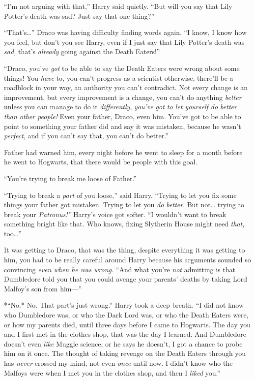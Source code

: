 ``I'm not arguing with that,'' Harry said quietly. ``But will you say
that Lily Potter's death was sad? Just say that one thing?''

``That's\ldots{}'' Draco was having difficulty finding words again. ``I
know, I know how you feel, but don't you see Harry, even if I just say
that Lily Potter's death was \emph{sad,} that's \emph{already} going
against the Death Eaters!''

``Draco, you've \emph{got} to be able to say the Death Eaters were wrong
about some things! You \emph{have} to, you can't progress as a scientist
otherwise, there'll be a roadblock in your way, an authority you can't
contradict. Not every change is an improvement, but every improvement is
a change, you can't do anything \emph{better} unless you can manage to
do it \emph{differently}, \emph{you've got to let yourself do better
than other people!} Even your father, Draco, even him. You've got to be
able to point to something your father did and say it was mistaken,
because he wasn't \emph{perfect}, and if you can't say that, you can't
do better.''

Father had warned him, every night before he went to sleep for a month
before he went to Hogwarts, that there would be people with this goal.

``You're trying to break me loose of Father.''

``Trying to break a \emph{part} of you loose,'' said Harry. ``Trying to
let you fix some things your father got mistaken. Trying to let you
\emph{do better}. But not\ldots{} trying to break your
\emph{Patronus!''} Harry's voice got softer. ``I wouldn't want to break
something bright like that. Who knows, fixing Slytherin House might need
\emph{that}, too\ldots{}''

It was getting to Draco, that was the thing, despite everything it was
getting to him, you had to be really careful around Harry because his
arguments sounded so convincing \emph{even when he was wrong.} ``And
what you're \emph{not} admitting is that Dumbledore told you that you
could avenge your parents' deaths by taking Lord Malfoy's son from
him---''

*``No.* No. That part's just wrong.'' Harry took a deep breath. ``I did
not know who Dumbledore was, or who the Dark Lord was, or who the Death
Eaters were, or how my parents died, until three days before I came to
Hogwarts. The day you and I first met in the clothes shop, that was the
day I learned. And Dumbledore doesn't even \emph{like} Muggle science,
or he says he doesn't, I got a chance to probe him on it once. The
thought of taking revenge on the Death Eaters through you has
\emph{never} crossed my mind, not even \emph{once} until now. I didn't
know who the Malfoys were when I met you in the clothes shop, and then I
\emph{liked} you.''

